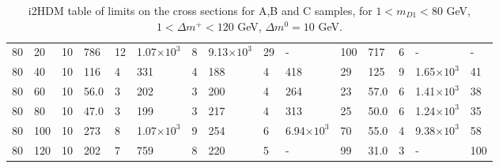 \begin{table}[!ht]
\begin{center}
{\begin{tabular}{|l|l|l||l|l|l|l|l|l||l|l|l|l|l|l|}
80	&	20	&	10	&	786	&	12	&	1.07$\times10^3$	&	8	&	9.13$\times10^3$	&	29	&	-	&	100	&	717	&	6	&	-	&	-	\\



80	&	40	&	10	&	116	&	4	&	331	&	4	&	188	&	4	&	418	&	29	&	125	&	9	&	1.65$\times10^3$	&	41	\\



80	&	60	&	10	&	56.0	&	3	&	202	&	3	&	200	&	4	&	264	&	23	&	57.0	&	6	&	1.41$\times10^3$	&	38	\\



80	&	80	&	10	&	47.0	&	3	&	199	&	3	&	217	&	4	&	313	&	25	&	50.0	&	6	&	1.24$\times10^3$	&	35	\\

80	&	100	&	10	&	273	&	8	&	1.07$\times10^3$	&	9	&	254	&	6	&	6.94$\times10^3$	&	70	&	55.0	&	4	&	9.38$\times10^3$	&	58	\\

80	&	120	&	10	&	202	&	7	&	759	&	8	&	220	&	5	&	-	&	99	&	31.0	&	3	&	-	&	100
		\end{tabular}%
}
\caption{i2HDM table of limits on the cross sections for A,B and C samples, for $1<m_{D1}<80$ GeV, $1<\Delta m^+<120$ GeV, $\Delta m^0=10$ GeV.}
\label{tab:i2hdm_exc_2}
\end{center}
\end{table}

\clearpage

